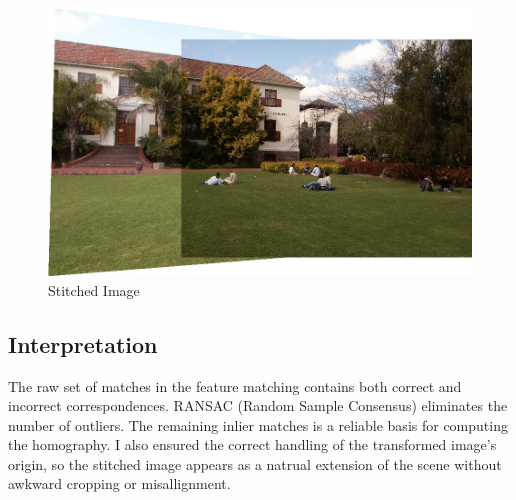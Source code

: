 \documentclass{article}
\begin{document}
\begin{figure}[H]
    \centering
    \includegraphics[width=\textwidth]{q4/output/stitched.jpg}
    \caption{Stitched Image}
\end{figure}
\subsection{Interpretation}
The raw set of matches in the feature matching contains both correct and incorrect correspondences.
RANSAC (Random Sample Consensus) eliminates the number of outliers. The remaining inlier matches is 
a reliable basis for computing the homography. I also ensured the correct handling of the transformed 
image's origin, so the stitched image appears as a natrual extension of the scene without awkward
cropping or misallignment.

\nocite{*}


\end{document}
